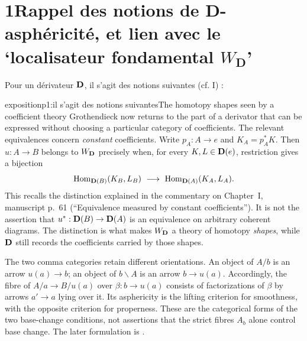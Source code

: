 \clearpage

\printedpage{}


\clearpage



\section*{1\quad Rappel des notions de D-asphéricité, et lien avec le ‘localisateur fondamental $W_{\mathbf{D}}$’}

Pour un dérivateur $\mathbf{D}$, il s’agit des notions suivantes (cf. I) :

\begin{dcomment}{exposition}{p1:il s’agit des notions suivantes}{The homotopy shapes seen by a coefficient theory}
Grothendieck now returns to the part of a derivator that can be expressed without choosing a particular category of coefficients. The relevant equivalences concern \emph{constant} coefficients. Write $p_A:A\to e$ and $K_A=p_A^*K$. Then $u:A\to B$ belongs to $W_{\mathbf{D}}$ precisely when, for every $K,L\in\mathbf{D}(e)$, restriction gives a bijection
\[
 \Hom_{\D(B)}(K_B,L_B)\ \longrightarrow\
 \Hom_{\D(A)}(K_A,L_A).
\]
This recalls the distinction explained in the commentary on Chapter~I, manuscript p.~61 (``Equivalence measured by constant coefficients''). It is not the assertion that $u^*:\mathbf{D}(B)\to\mathbf{D}(A)$ is an equivalence on arbitrary coherent diagrams. The distinction is what makes $W_{\mathbf{D}}$ a theory of homotopy \emph{shapes}, while $\mathbf{D}$ still records the coefficients carried by those shapes.

The two comma categories retain different orientations. An object of $A/b$ is an arrow $u(a)\to b$; an object of $b\backslash A$ is an arrow $b\to u(a)$. Accordingly, the fibre of $A/a\to B/u(a)$ over $\beta:b\to u(a)$ consists of factorizations of $\beta$ by arrows $a'\to a$ lying over it. Its asphericity is the lifting criterion for smoothness, with the opposite criterion for properness. These are the categorical forms of the two base-change conditions, not assertions that the strict fibres $A_b$ alone control base change. The later formulation is \citet[Theorem~1.2 and its dual]{Maltsiniotis2005Asphericite}.
\end{dcomment}



